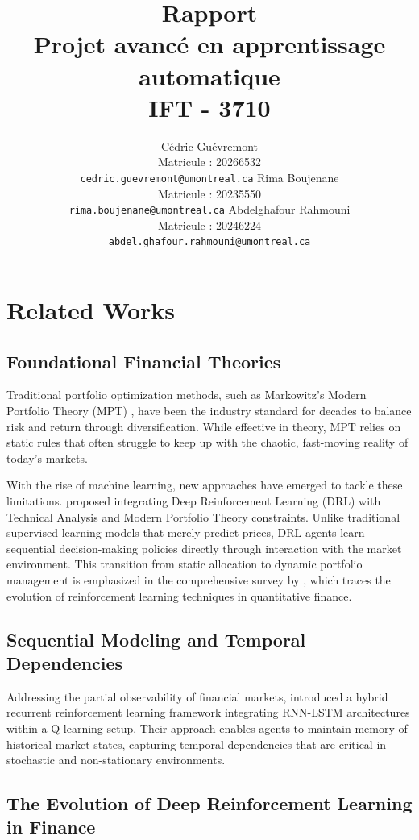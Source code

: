 \documentclass[final]{article}
\title{Rapport \\
        Projet avancé en apprentissage automatique \\
        IFT - 3710}
\author{
    Cédric Guévremont \\
    Matricule : 20266532 \\
    \texttt{cedric.guevremont@umontreal.ca}
    \And
    Rima Boujenane \\
     Matricule : 20235550 \\
    \texttt{rima.boujenane@umontreal.ca}
    \And
    Abdelghafour Rahmouni \\
    Matricule : 20246224 \\
    \texttt{abdel.ghafour.rahmouni@umontreal.ca}
}
\begin{document}
\maketitle
\section{Related Works}

\subsection{Foundational Financial Theories}

Traditional portfolio optimization methods, such as Markowitz's Modern Portfolio Theory (MPT) \citep{markowitz1952portfolio}, have been the industry standard for decades to balance risk and return through diversification. While effective in theory, MPT relies on static rules that often struggle to keep up with the chaotic, fast-moving reality of today's markets.

With the rise of machine learning, new approaches have emerged to tackle these limitations. \citet{jang2023deep} proposed integrating Deep Reinforcement Learning (DRL) with Technical Analysis and Modern Portfolio Theory constraints. Unlike traditional supervised learning models that merely predict prices, DRL agents learn sequential decision-making policies directly through interaction with the market environment. This transition from static allocation to dynamic portfolio management is emphasized in the comprehensive survey by \citet{pippas2025evolution}, which traces the evolution of reinforcement learning techniques in quantitative finance.

\subsection{Sequential Modeling and Temporal Dependencies}

Addressing the partial observability of financial markets, \citet{li2015recurrent} introduced a hybrid recurrent reinforcement learning framework integrating RNN-LSTM architectures within a Q-learning setup. Their approach enables agents to maintain memory of historical market states, capturing temporal dependencies that are critical in stochastic and non-stationary environments.

\subsection{The Evolution of Deep Reinforcement Learning in Finance}
\end{document}
